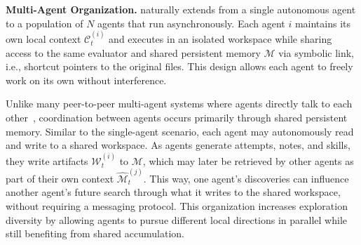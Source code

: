 

\textbf{Multi-Agent Organization.}
\method{} naturally extends from a single autonomous agent to a population of \(N\) agents that run asynchronously. Each agent \(i\) maintains its own local context \(\mathcal{C}_t^{(i)}\) and executes in an isolated workspace while sharing access to the same evaluator and shared persistent memory \(\mathcal{M}\) via symbolic link, i.e., shortcut pointers to the original files. This design allows each agent to freely work on its own without interference.


Unlike many peer-to-peer multi-agent systems where agents directly talk to each other~\citep{langgraph2024}, coordination between agents occurs primarily through shared persistent memory. Similar to the single-agent scenario, each agent may autonomously read and write to a shared workspace. As agents generate attempts, notes, and skills, they write artifacts \(\mathcal{W}_t^{(i)}\) to \(\mathcal{M}\), which may later be retrieved by other agents as part of their own context \(\hat{\mathcal{M}}_t^{(j)}\). %
This way, one agent's discoveries can influence another agent's future search through what it writes to the shared workspace, without requiring a messaging protocol. 
This organization increases exploration diversity by allowing agents to pursue different local directions in parallel while still benefiting from shared accumulation. 




